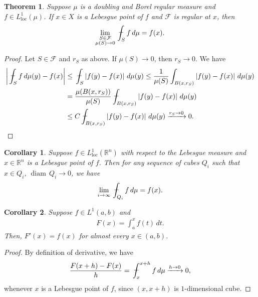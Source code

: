 \documentclass[11pt]{book}
\newtheorem{theorem}{Theorem}[chapter]
\newtheorem{corollary}{Corollary}[theorem]
\theoremstyle{definition}
\numberwithin{equation}{chapter}
\def\diam{{\operatorname{diam}\,}}
\def\avint{\,\ThisStyle{\ensurestackMath{%
  \stackinset{c}{.2\LMpt}{c}{1\LMpt}{\SavedStyle-}{\SavedStyle\phantom{\int}}}%
  \setbox0=\hbox{$\SavedStyle\int\,$}\kern-\wd0}\int}
\begin{document}
\medskip

\begin{theorem}
Suppose $\mu$ is a doubling and Borel regular measure and $f \in L^1_{\operatorname{loc}}(\mu)$. If $x \in X$ is a Lebesgue point of $f$ and $\mathcal{F}$ is regular at $x$, then 
\begin{align*}
    \lim_{\substack{S \in \mathcal{F}\\ \mu(S) \to 0}} \avint_S f\,d\mu = f(x).
\end{align*}
\end{theorem}
\begin{proof}
Let $S \in \mathcal{F}$ and $r_S$ as above. If $\mu(S) \to 0$, then $r_S \to 0$. We have
\begin{align*}
    \left|\avint_S f\,d\mu(y) - f(x)\right| & \leq \avint_S \left|f(y) - f(x)\right| \,d\mu(y) \leq \frac{1}{\mu(S)} \int_{B(x,r_S)} \left|f(y) - f(x)\right| \,d\mu(y) \\
    & = \frac{\mu(B(x,r_S))}{\mu(S)} \avint_{B(x,r_S)} \left|f(y) - f(x)\right| \,d\mu(y) \\
    & \leq C \avint_{B(x,r_S)} \left|f(y) - f(x)\right| \,d\mu(y) \xrightarrow[]{r_S \to 0} 0.
\end{align*}
\end{proof}

\medskip

\begin{corollary}
Suppose $f \in L^1_{\operatorname{loc}}(\mathbb{R}^n)$ with respect to the Lebesgue measure and $x \in \mathbb{R}^n$ is a Lebesgue point of $f$. Then for any sequence of cubes $Q_i$ such that $x \in Q_i$, $\diam Q_i \to 0$, we have
\begin{align*}
    \lim_{i \to \infty} \avint_{Q_i} f \,d\mu = f(x).
\end{align*}
\end{corollary}

\medskip

\begin{corollary}
Suppose $f \in L^1(a,b)$ and
\begin{align*}
    F(x) = \int^x_a f(t)\,dt.
\end{align*}
Then, $F'(x) = f(x)$ for almost every $x \in (a,b)$.
\end{corollary}
\begin{proof}
By definition of derivative, we have
\begin{align*}
    \frac{F(x + h) - F(x)}{h} = \avint^{x+h}_x f\,d\mu \xrightarrow[]{h \to 0} 0,
\end{align*}
whenever $x$ is a Lebesgue point of $f$, since $(x,x+h)$ is $1$-dimensional cube. 
\end{proof}
\end{document}
